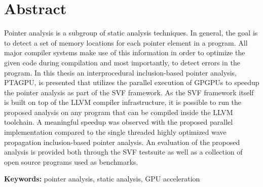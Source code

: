 \chapter*{Abstract}

Pointer analysis is a subgroup of static analysis techniques. 
In general, the goal is to detect a set of memory locations for each pointer element in a program. 
All major compiler systems make use of this information in order to optimize the given code during compilation
and most importantly, to detect errors in the program.
In this thesis an interprocedural inclusion-based pointer analysis, PTAGPU, is presented that utilizes the parallel execution of GPGPUs to speedup the pointer analysis as part of the SVF framework. 
As the SVF framework itself is built on top of the LLVM compiler infrastructure, 
it is possible to run the proposed analysis on any program that can be compiled inside the LLVM toolchain.
A meaningful speedup was observed with the proposed parallel implementation compared to the single threaded highly optimized wave propagation inclusion-based pointer analysis.
An evaluation of the proposed analysis is provided both through the SVF testsuite as well as a collection of open source programs used as benchmarks.

\textbf{Keywords:} pointer analysis, static analysis, GPU acceleration